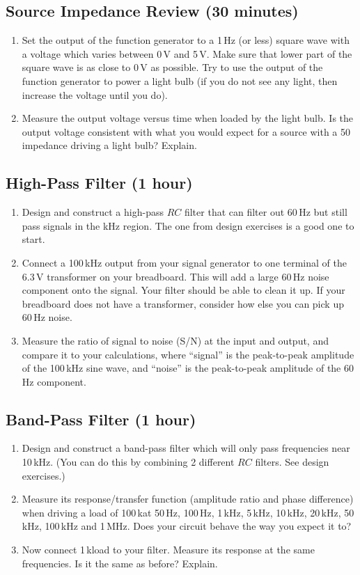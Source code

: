 \documentclass{article}
\begin{document}
\subsection{Source Impedance Review (30 minutes)}
\begin{enumerate}
\item Set the output of the function generator to a 1\,Hz (or less) square wave with a voltage which varies between 0\,V and 5\,V. Make sure that lower part of the square wave is as close to 0\,V as possible. Try to use the output of the function generator to power a light bulb (if you do not see any light, then increase the voltage until you do).
\item Measure the output voltage versus time when loaded by the light bulb. Is the output voltage consistent with what you would expect for a source with a 50\,\Ohm impedance driving a light bulb? Explain.
\end{enumerate}

\subsection{High-Pass Filter (1 hour)}
\begin{enumerate}[resume]
\item Design and construct a high-pass $RC$ filter that can filter out  60\,Hz but still pass signals in the kHz region. The one from design exercises is a good one to start.
\item Connect a 100\,kHz output from your signal generator to one terminal of the 6.3\,V transformer on your breadboard. This will add a large 60\,Hz noise component onto the signal. Your filter should be able to clean it up.  If your breadboard does not have a transformer, consider how else you can pick up 60\,Hz noise.
\item Measure the ratio of signal to noise (S/N) at the input and output, and compare it to your calculations, where ``signal'' is the peak-to-peak amplitude of the 100\,kHz sine wave, and ``noise'' is the peak-to-peak amplitude of the  60\,Hz component.
\end{enumerate}

\subsection{Band-Pass Filter (1 hour)}
\begin{enumerate}[resume]
\item Design and construct a band-pass filter which will only pass frequencies near 10\,kHz. (You can do this by combining 2 different $RC$ filters. See design exercises.)
\item Measure its response/transfer function (amplitude ratio and phase difference) when driving a load of 100\,k\Ohm at 50\,Hz, 100\,Hz, 1\,kHz, 5\,kHz, 10\,kHz, 20\,kHz, 50\,kHz, 100\,kHz and 1\,MHz. Does your circuit behave the way you expect it to? 
\item Now connect 1\,k\Ohm load to your filter. Measure its response at the same frequencies. Is it the same as before? Explain.
\end{enumerate}
\end{document}
